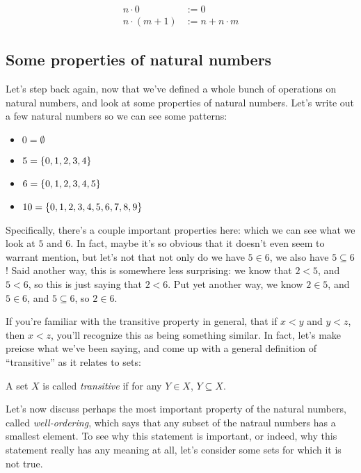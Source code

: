 \begin{align*}
    n \cdot 0 &:= 0 \\
    n \cdot (m + 1) &:= n + n \cdot m
\end{align*}


\subsection{Some properties of natural numbers}

Let's step back again, now that we've defined a whole bunch of operations on natural numbers, and look at some properties of natural numbers.
Let's write out a few natural numbers so we can see some patterns:

\begin{itemize}
    \item[] $0 = \emptyset$
    \item[] $5 = {\left\{ {0,1,2,3,4} \right\}}$
    \item[] $6 = {\left\{ {0,1,2,3,4,5} \right\}}$
    \item[] $10 = {\left\{ {0,1,2,3,4,5,6,7,8,9} \right\}}$
\end{itemize}

Specifically, there's a couple important properties here: which we can see what we look at $5$ and $6$.
In fact, maybe it's so obvious that it doesn't even seem to warrant mention, but let's not that not only do we have $5 \in 6$, we also have $5 \subseteq 6$!
Said another way, this is somewhere less surprising: we know that $2 < 5$, and $5 < 6$, so this is just saying that $2 < 6$.
Put yet another way, we know $2 \in 5$, and $5 \in 6$, and $5 \subseteq 6$, so $2 \in 6$.

If you're familiar with the transitive property in general, that if $x < y$ and $y < z$, then $x < z$, you'll recognize this as being something similar.
In fact, let's make preicse what we've been saying, and come up with a general definition of ``transitive'' as it relates to sets:

\begin{definition}
    A set $X$ is called \emph{transitive} if for any $Y \in X$, $Y \subseteq X$.
\end{definition}

Let's now discuss perhaps the most important property of the natural numbers, called \emph{well-ordering}, which says that any subset of the natraul numbers has a smallest element.
To see why this statement is important, or indeed, why this statement really has any meaning at all, let's consider some sets for which it is not true.

